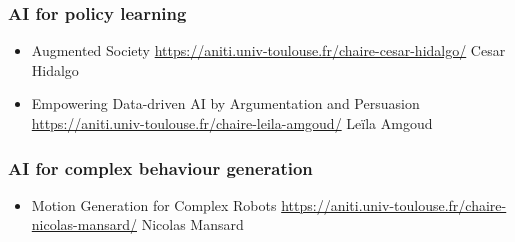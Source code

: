 \subsubsection{AI for policy learning}

\begin{itemize}
    \item Augmented Society
        \url{https://aniti.univ-toulouse.fr/chaire-cesar-hidalgo/}
        Cesar Hidalgo
    \item Empowering Data-driven AI by Argumentation and Persuasion
        \url{https://aniti.univ-toulouse.fr/chaire-leila-amgoud/}
Leïla Amgoud
\end{itemize}

\subsubsection{AI for complex behaviour generation}

\begin{itemize}
    \item Motion Generation for Complex Robots 
        \url{https://aniti.univ-toulouse.fr/chaire-nicolas-mansard/}
Nicolas Mansard
\end{itemize}


